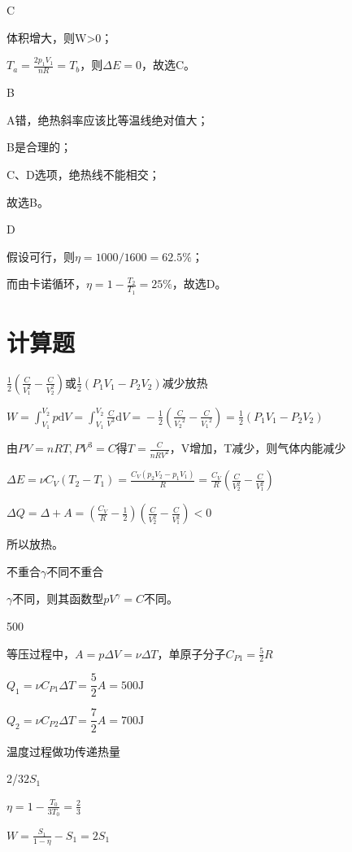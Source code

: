 \documentclass[b5paper,opensource]{./template/qyxf-book}
\newcommand{\di}[1]{\mathrm{d}#1}
\begin{document}
C

\solve 体积增大，则W>0；

$T_a=\frac{2p_1V_1}{nR}=T_b$，则$\Delta E=0$，故选C。

B

\solve A错，绝热斜率应该比等温线绝对值大；

B是合理的；

C、D选项，绝热线不能相交；

故选B。

D

\solve 假设可行，则$\eta=1000/1600=62.5\%$；

而由卡诺循环，$\eta=1-\frac{T_2}{T_1}=25\%$，故选D。

\section{计算题}
$\frac{1}{2}(\frac{C}{V_1^2}-\frac{C}{V_2^2})$或$\frac{1}{2}(P_1V_1-P_2V_2)$\qquad 减少\qquad 放热

\solve $W = \int_{{V_1}}^{{V_2}} {p\di{V} = } \int_{V_1}^{V_2}{\frac{C}{{{V^3}}}\di{V}=}- \frac{1}{2}(\frac{C}{{{V_2}^2}}-\frac{C}{{{V_1}^2}})=\frac{1}{2}(P_1V_1-P_2V_2)$

由$PV = nRT,P{V^3} = C$得$T=\frac{C}{nRV^2}$，V增加，T减少，则气体内能减少

$\Delta E = \nu {C_V}({T_2}-{T_1})= \frac{{{C_V}({p_2}{V_2} - {p_1}{V_1})}}{R} = \frac{C_V}{R}(\frac{C}{V_2^2}-\frac{C}{V_1^2})$

$\Delta Q = \Delta  + A = (\frac{C_V}{R} - \frac{1}{2})(\frac{C}{V_2^2} - \frac{C}{V_1^2}) < 0$

所以放热。

不重合\qquad$\gamma$不同\qquad 不重合

\solve
$\gamma$不同，则其函数型$pV^\gamma=C$不同。

500

\solve 
等压过程中，$A=p\Delta V=\nu \Delta T$，单原子分子$C_{P1}=\frac{5}{2}R$

$Q_1=\nu C_{P1} \Delta T=\dfrac{5}{2}A=500\mathrm{J}$

$Q_2=\nu C_{P2} \Delta T=\dfrac{7}{2}A=700\mathrm{J}$

温度\qquad 过程\qquad 做功\qquad 传递热量

2/3\qquad$2S_1$

\solve
$\eta =1-\frac{T_0}{3T_0}=\frac{2}{3}$

$W=\frac{S_1}{1-\eta}-S_1=2S_1$
\end{document}
